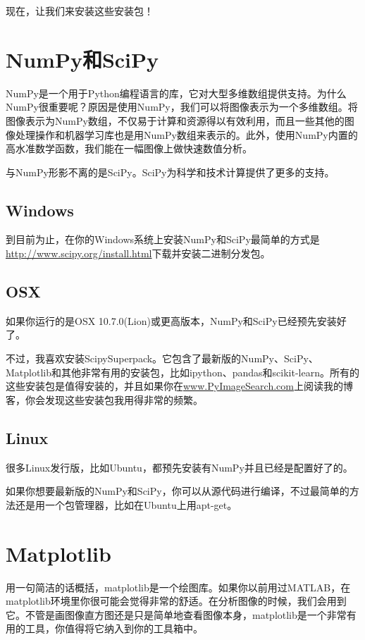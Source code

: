 \documentclass[color=cyan,mathpazo,titlestyle=hang]{elegantbook}
\begin{document}
现在，让我们来安装这些安装包！

\section{NumPy和SciPy}

NumPy是一个用于Python编程语言的库，它对大型多维数组提供支持。为什么NumPy很重要呢？原因是使用NumPy，我们可以将图像表示为一个多维数组。将图像表示为NumPy数组，不仅易于计算和资源得以有效利用，而且一些其他的图像处理操作和机器学习库也是用NumPy数组来表示的。此外，使用NumPy内置的高水准数学函数，我们能在一幅图像上做快速数值分析。

与NumPy形影不离的是SciPy。SciPy为科学和技术计算提供了更多的支持。

\subsection{Windows}

到目前为止，在你的Windows系统上安装NumPy和SciPy最简单的方式是\url{http://www.scipy.org/install.html}下载并安装二进制分发包。

\subsection{OSX}

如果你运行的是OSX 10.7.0(Lion)或更高版本，NumPy和SciPy已经预先安装好了。

不过，我喜欢安装ScipySuperpack。它包含了最新版的NumPy、SciPy、Matplotlib和其他非常有用的安装包，比如ipython、pandas和scikit-learn。所有的这些安装包是值得安装的，并且如果你在\url{www.PyImageSearch.com}上阅读我的博客，你会发现这些安装包我用得非常的频繁。

\subsection{Linux}

很多Linux发行版，比如Ubuntu，都预先安装有NumPy并且已经是配置好了的。

如果你想要最新版的NumPy和SciPy，你可以从源代码进行编译，不过最简单的方法还是用一个包管理器，比如在Ubuntu上用apt-get。

\section{Matplotlib}

用一句简洁的话概括，matplotlib是一个绘图库。如果你以前用过MATLAB，在matplotlib环境里你很可能会觉得非常的舒适。在分析图像的时候，我们会用到它。不管是画图像直方图还是只是简单地查看图像本身，matplotlib是一个非常有用的工具，你值得将它纳入到你的工具箱中。
\end{document}
